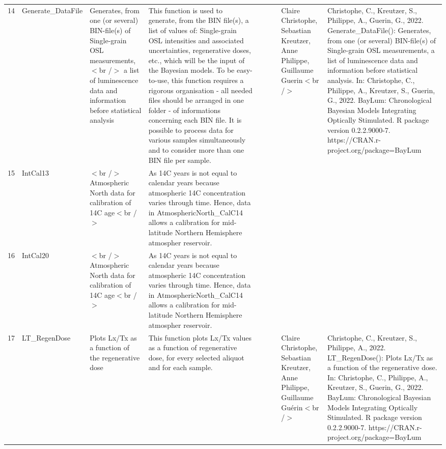 \begin{table}[ht]
\begin{tabular}{rllllllll}
 \\ 
  14 & Generate\_DataFile & Generates, from one (or several) BIN-file(s) of Single-grain OSL measurements,$<$br /$>$ a list of luminescence data and information before statistical analysis & This function is used to generate, from the BIN file(s), a list of values of: Single-grain  OSL intensities and associated uncertainties, regenerative doses, etc., which will be the input of the Bayesian models. To be easy-to-use, this function requires a rigorous organisation - all needed files should be arranged in one folder - of informations concerning each BIN file.   It is possible to process data for various samples simultaneously and to consider more than one BIN file per sample. &  &  &  & Claire Christophe, Sebastian Kreutzer, Anne Philippe, Guillaume Guerin$<$br /$>$ & Christophe, C., Kreutzer, S., Philippe, A., Guerin, G., 2022. Generate\_DataFile(): Generates, from one (or several) BIN-file(s) of Single-grain OSL measurements, a list of luminescence data and information before statistical analysis. In: Christophe, C., Philippe, A., Kreutzer, S., Guerin, G., 2022. BayLum: Chronological Bayesian Models Integrating Optically Stimulated. R package version 0.2.2.9000-7. https://CRAN.r-project.org/package=BayLum
 \\ 
  15 & IntCal13 & $<$br /$>$ Atmospheric North data for calibration of 14C age$<$br /$>$ & As 14C years is not equal to calendar years because atmospheric 14C concentration varies through time. Hence, data in AtmosphericNorth\_CalC14 allows a calibration for mid-latitude Northern Hemisphere atmospher reservoir. &  &  &  &  &  \\ 
  16 & IntCal20 & $<$br /$>$ Atmospheric North data for calibration of 14C age$<$br /$>$ & As 14C years is not equal to calendar years because atmospheric 14C concentration varies through time. Hence, data in AtmosphericNorth\_CalC14 allows a calibration for mid-latitude Northern Hemisphere atmospher reservoir. &  &  &  &  &  \\ 
  17 & LT\_RegenDose & Plots Lx/Tx as a function of the regenerative dose & This function plots  Lx/Tx  values as a function of regenerative dose, for every selected aliquot and for each sample. &  &  &  & Claire Christophe, Sebastian Kreutzer, Anne Philippe, Guillaume Guérin$<$br /$>$ & Christophe, C., Kreutzer, S., Philippe, A., 2022. LT\_RegenDose(): Plots Lx/Tx as a function of the regenerative dose. In: Christophe, C., Philippe, A., Kreutzer, S., Guerin, G., 2022. BayLum: Chronological Bayesian Models Integrating Optically Stimulated. R package version 0.2.2.9000-7. https://CRAN.r-project.org/package=BayLum

\end{tabular}
\end{table}
